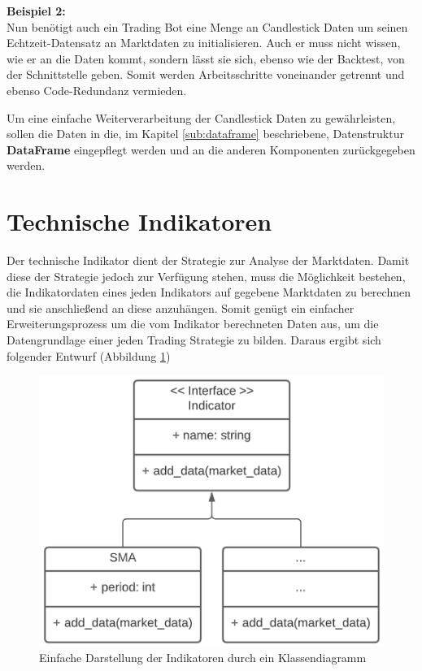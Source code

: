 \documentclass[oneside]{ausarbeitung}
\begin{document}
\textbf{Beispiel 2:} \\
Nun benötigt auch ein Trading Bot eine Menge an Candlestick Daten um seinen Echtzeit-Datensatz an Marktdaten zu initialisieren. Auch er muss nicht wissen, wie er an die Daten kommt, sondern lässt sie sich, ebenso wie der Backtest, von der Schnittstelle geben. Somit werden Arbeitsschritte voneinander getrennt und ebenso Code-Redundanz vermieden.

Um eine einfache Weiterverarbeitung der Candlestick Daten zu gewährleisten, sollen die Daten in die, im Kapitel \ref{sub:dataframe} beschriebene, Datenstruktur \textbf{DataFrame} eingepflegt werden und an die anderen Komponenten zurückgegeben werden.


\section{Technische Indikatoren}
\label{sec:technische_Indikatoren}

Der technische Indikator dient der Strategie zur Analyse der Marktdaten. Damit diese der Strategie jedoch zur Verfügung stehen, muss die Möglichkeit bestehen, die Indikatordaten eines jeden Indikators auf gegebene Marktdaten zu berechnen und sie anschließend an diese anzuhängen. Somit genügt ein einfacher Erweiterungsprozess um die vom Indikator berechneten Daten aus, um die
Datengrundlage einer jeden Trading Strategie zu bilden. Daraus ergibt sich folgender Entwurf (Abbildung \ref{fig:10})

\begin{figure}[H]
  \centering
  \includegraphics[height=0.34\textheight]{uml/indicators_uml.png}
  \caption{Einfache Darstellung der Indikatoren durch ein Klassendiagramm}
  \label{fig:10}
\end{figure}
\end{document}
